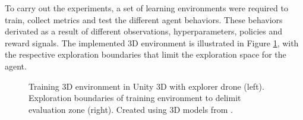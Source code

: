 

To carry out the experiments, a set of learning environments were required to train, collect metrics and test the different agent behaviors. These behaviors derivated as a result of different observations, hyperparameters, policies and reward signals. The implemented 3D environment is illustrated in Figure \ref{fig:unity-island}, with the respective exploration boundaries that limit the exploration space for the agent.

\begin{figure}[!ht]
    \centering
    \caption{Training 3D environment in Unity 3D with explorer drone (left). Exploration boundaries of training environment to delimit evaluation zone (right). Created using 3D models from \cite{unity-asset-store}.}
    \label{fig:unity-island}
\end{figure}

% 

